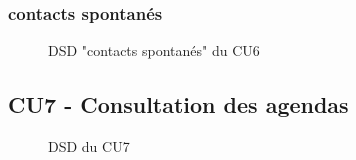 \subsubsection{contacts spontanés}
\begin{figure}[H]
\noindent{}
\caption{DSD "contacts spontanés" du CU6}
\end{figure}


\subsection{CU7 - Consultation des agendas}
\begin{figure}[H]
\noindent{}
\caption{DSD du CU7}
\end{figure}

